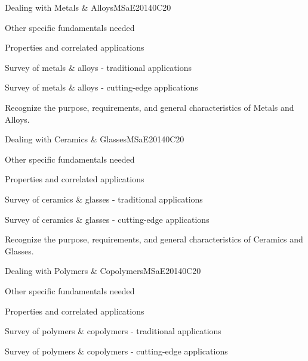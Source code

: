 \begin{syllabus}
\begin{unit}{Dealing with Metals \& Alloys}{}{MSaE2014}{0}{C20}
\begin{topics}
      \item Other specific fundamentals needed
      \item Properties and correlated applications
      \item Survey of metals \& alloys - traditional applications
      \item Survey of metals \& alloys - cutting-edge applications
\end{topics}
   \begin{learningoutcomes}
      \item Recognize the purpose, requirements, and general characteristics of Metals and Alloys.
   \end{learningoutcomes}
\end{unit}


\begin{unit}{Dealing with Ceramics \& Glasses}{}{MSaE2014}{0}{C20}
\begin{topics}
      \item Other specific fundamentals needed
      \item Properties and correlated applications
      \item Survey of ceramics \& glasses - traditional applications
      \item Survey of ceramics \& glasses - cutting-edge applications
\end{topics}
   \begin{learningoutcomes}

      \item Recognize the purpose, requirements, and general characteristics of Ceramics and Glasses.
   \end{learningoutcomes}
\end{unit}

\begin{unit}{Dealing with Polymers \& Copolymers}{}{MSaE2014}{0}{C20}
\begin{topics}
      \item Other specific fundamentals needed
      \item Properties and correlated applications
      \item Survey of polymers \& copolymers - traditional applications
      \item Survey of polymers \& copolymers - cutting-edge applications
\end{topics}
   \begin{learningoutcomes}


\end{learningoutcomes}
\end{unit}
\end{syllabus}

